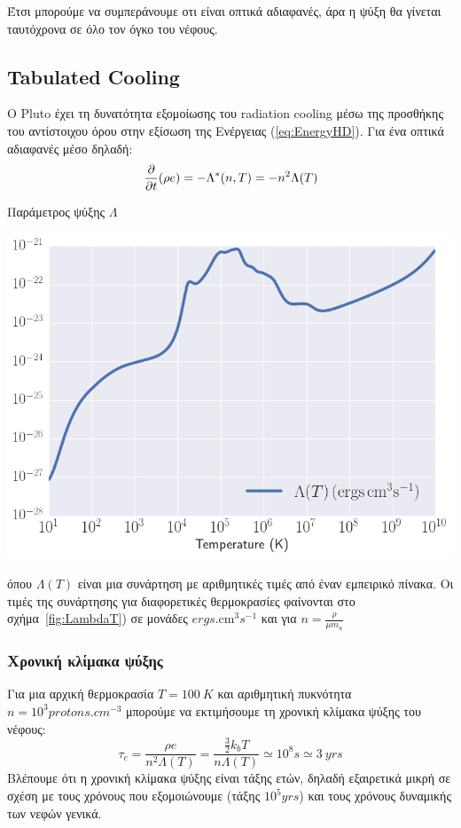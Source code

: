 \documentclass[article,a4paper,11.2pt]{memoir}
\numberwithin{equation}{subsection}
\begin{document}
	Έτσι μπορούμε να συμπεράνουμε οτι είναι οπτικά αδιαφανές, άρα η ψύξη θα γίνεται ταυτόχρονα σε όλο τον όγκο του νέφους. 
	
	\subsection{Tabulated Cooling}
	Ο Pluto έχει τη δυνατότητα εξομοίωσης του radiation cooling μέσω της προσθήκης του αντίστοιχου όρου στην εξίσωση 
	της Ενέργειας (\ref{eq:EnergyHD}). Για ένα οπτικά αδιαφανές μέσο δηλαδή: 
	\begin{equation}
		\pdv{t}(\rho e)=-\Lambda^*(n,T)=-n^2 \Lambda(T)
	\end{equation}
	
		\begin{marginfigure}
		\caption{Παράμετρος ψύξης $\Lambda$}
		\includegraphics[width=1.0\linewidth]{Images/LambdaT}
		\label{fig:LambdaT}
	\end{marginfigure}

	όπου  $\Lambda (T )$  είναι μια συνάρτηση με αριθμητικές τιμές από έναν εμπειρικό πίνακα. Οι τιμές της συνάρτησης για διαφορετικές θερμοκρασίες φαίνονται στο σχήμα~\ref{fig:LambdaT}) σε μονάδες $ \si{ergs.\cm^3 s^{-1}}$ και για  $n=\frac{\rho}{\mu m_u}$

	
	\subsubsection{Χρονική κλίμακα ψύξης}
	Για μια αρχική θερμοκρασία $T=\SI{100}{K}$ και αριθμητική πυκνότητα $n=10^3\si{protons.cm^{-3}}$ μπορούμε να εκτιμήσουμε τη χρονική κλίμακα ψύξης του νέφους:
	\begin{equation}
		\tau _c =\frac{ \rho e} {n^2 \Lambda (T)}=
		\frac{ \frac{3}{2}k_b T} {n \Lambda (T)} 
		\simeq 10^8\si{s}\simeq \SI{3}{yrs}
	\end{equation}
	Βλέπουμε ότι η χρονική κλίμακα ψύξης είναι τάξης ετών, δηλαδή εξαιρετικά μικρή σε σχέση με τους χρόνους που εξομοιώνουμε (τάξης $10^5\si{yrs}$) και τους χρόνους δυναμικής των νεφών γενικά.   
	
\end{document}
